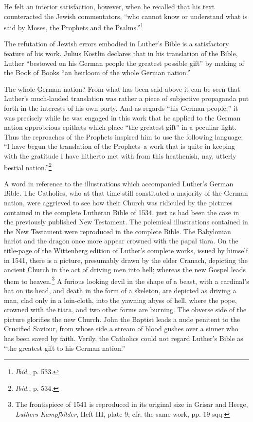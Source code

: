 He felt an interior satisfaction, however, when he recalled that
his text counteracted the Jewish commentators, “who cannot know
or understand what is said by Moses, the Prophets and the Psalms.”\footnote{\textit{Ibid.}, p. 533.}

The refutation of Jewish errors embodied in Luther’s Bible is a
satisfactory feature of his work.
Julius Köstlin declares that in his translation of the Bible, Luther
“bestowed on his German people the greatest possible gift” by making of
the Book of Books “an heirloom of the whole German nation.”

The whole German nation? From what has been said above it can be
seen that Luther’s much-lauded translation was rather a piece of subjective
propaganda put forth in the interests of his own party. And
as regards “his German people,” it was precisely while he was engaged
in this work that he applied to the German nation opprobrious
epithets which place “the greatest gift” in a peculiar light. Thus the
reproaches of the Prophets inspired him to use the following language:
“I have begun the translation of the Prophets--a work that is quite
in keeping with the gratitude I have hitherto met with from this
heathenish, nay, utterly bestial nation.”\footnote{\textit{Ibid.}, p. 534.}

A word in reference to the illustrations which accompanied Luther’s
German Bible. The Catholics, who at that time still constituted a
majority of the German nation, were aggrieved to see how their
Church was ridiculed by the pictures contained in the complete Lutheran
Bible of 1534, just as had been the case in the previously published New
Testament. The polemical illustrations contained in the
New Testament were reproduced in the complete Bible. The Babylonian
harlot and the dragon once more appear crowned with the
papal tiara. On the title-page of the Wittenberg edition of Luther’s
complete works, issued by himself in 1541, there is a picture, presumably
drawn by the elder Cranach, depicting the ancient Church
in the act of driving men into hell; whereas the new Gospel leads
them to heaven.\footnote
{The frontispiece of 1541 is reproduced in its original size in Grisar and Heege,
\textit{Luthers Kampfbilder}, Heft III, plate 9; cfr. the same work, pp. 19 sqq.}
A furious looking devil in the shape of a beast,
with a cardinal’s hat on its head, and death in the form of a skeleton,
are depicted as driving a man, clad only in a loin-cloth, into the yawning
abyss of hell, where the pope, crowned with the tiara, and two
other forms are burning. The obverse side of the picture glorifies the
new Church. John the Baptist leads a nude penitent to the Crucified
Saviour, from whose side a stream of blood gushes over a sinner who
has been saved by faith. Verily, the Catholics could not regard Luther’s
Bible as “the greatest gift to his German nation.”


